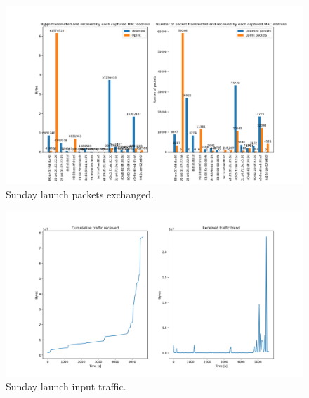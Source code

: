 \begin{figure}[h]
    \includegraphics[width=\textwidth]{Graphs/Sunday_launch_bytes_packets.png}
    \caption{Sunday launch packets exchanged.}
    \label{fig:Sunday launch packets.}
\end{figure}

\begin{figure}[h]
    \includegraphics[width=\textwidth]{Graphs/Sunday_launch_cum_in_traffic.png}
    \caption{Sunday launch input traffic.}
    \label{fig:Sunday launch input traffic.}
\end{figure}